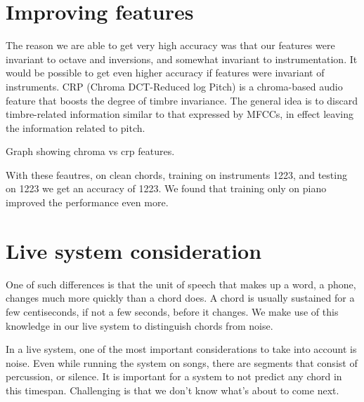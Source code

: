 \documentclass{article}
\begin{document}
\section{Improving features}

The reason we are able to get very high accuracy was that our features were invariant to octave and inversions, and somewhat invariant to instrumentation. It would be possible to get even higher accuracy if features were invariant of instruments. CRP (Chroma DCT-Reduced log Pitch) is a chroma-based audio feature that boosts the degree of timbre invariance. The general idea is to discard timbre-related information similar to that expressed by MFCCs, in effect leaving the information related to pitch.


Graph showing chroma vs crp features.

With these feautres, on clean chords, training on instruments 1223, and testing on 1223 we get an accuracy of 1223. We found that training only on piano improved the performance even more.

\section{Live system consideration}

One of such differences is that the unit of speech that makes up a word, a phone, changes much more quickly than a chord does. A chord is usually sustained for a few centiseconds, if not a few seconds, before it changes. We make use of this knowledge in our live system to distinguish chords from noise.
 
In a live system, one of the most important considerations to take into account is noise. Even while running the system on songs, there are segments that consist of percussion, or silence. It is important for a system to not predict any chord in this timespan. 
Challenging is that we don't know what's about to come next.



\end{document}
